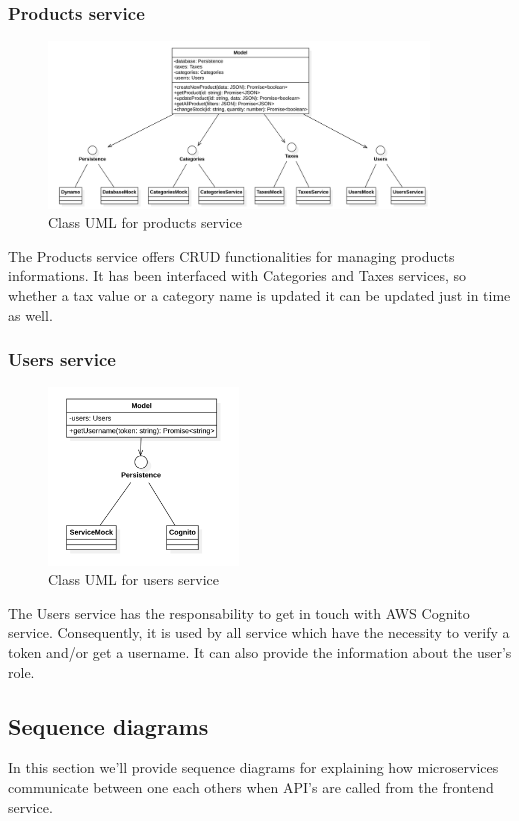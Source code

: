 \subsubsection{Products service}
\begin{figure}[H]
    \includegraphics[width=0.9\textwidth]{res/images/class-diagrams/products.png}
    \caption{Class UML for products service}
\end{figure}
The Products service offers CRUD functionalities for managing products informations. It has been interfaced with Categories and Taxes services, so whether a tax value or a category name
is updated it can be updated just in time as well.

\subsubsection{Users service}
\begin{figure}[H]
    \includegraphics[width=0.45\textwidth]{res/images/class-diagrams/users.png}
    \caption{Class UML for users service}
\end{figure}
The Users service has the responsability to get in touch with AWS Cognito service. Consequently, it is used by all service which have the necessity to verify
a token and/or get a username. It can also provide the information about the user's role.


\subsection{Sequence diagrams} \label{_sequenceDiagram}
In this section we'll provide sequence diagrams for explaining how microservices communicate between one each others when API's are called from the frontend service.

